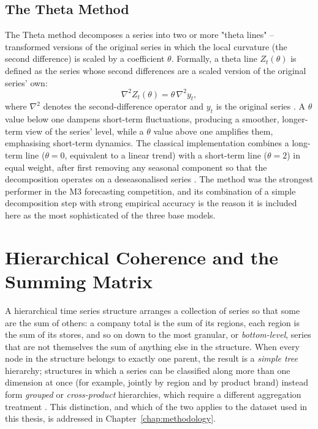 \subsection{The Theta Method}
\label{subsec:theta}

The Theta method decomposes a series into two or more "theta lines" -- transformed versions of the original series in which the local curvature (the second difference) is scaled by a coefficient $\theta$. Formally, a theta line $Z_t(\theta)$ is defined as the series whose second differences are a scaled version of the original series' own:
\[
\nabla^2 Z_t(\theta) = \theta\, \nabla^2 y_t ,
\]
where $\nabla^2$ denotes the second-difference operator and $y_t$ is the original series \cite{Assimakopoulos:2000}. A $\theta$ value below one dampens short-term fluctuations, producing a smoother, longer-term view of the series' level, while a $\theta$ value above one amplifies them, emphasising short-term dynamics. The classical implementation combines a long-term line ($\theta = 0$, equivalent to a linear trend) with a short-term line ($\theta = 2$) in equal weight, after first removing any seasonal component so that the decomposition operates on a deseasonalised series \cite{Assimakopoulos:2000}. The method was the strongest performer in the M3 forecasting competition, and its combination of a simple decomposition step with strong empirical accuracy is the reason it is included here as the most sophisticated of the three base models.

\section{Hierarchical Coherence and the Summing Matrix}
\label{sec:hierarchicalCoherence}

A hierarchical time series structure arranges a collection of series so that some are the sum of others: a company total is the sum of its regions, each region is the sum of its stores, and so on down to the most granular, or \emph{bottom-level}, series that are not themselves the sum of anything else in the structure. When every node in the structure belongs to exactly one parent, the result is a \emph{simple tree} hierarchy; structures in which a series can be classified along more than one dimension at once (for example, jointly by region and by product brand) instead form \emph{grouped} or \emph{cross-product} hierarchies, which require a different aggregation treatment \cite{Hyndman:2018}. This distinction, and which of the two applies to the dataset used in this thesis, is addressed in Chapter~\ref{chap:methodology}.

